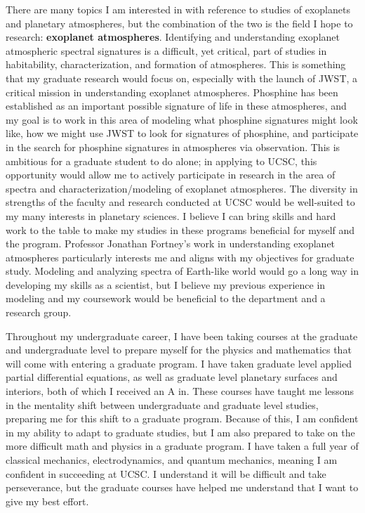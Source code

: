 \documentclass[11pt,letterpaper]{article}
\begin{document}
There are many topics I am interested in with reference to studies of exoplanets and planetary atmospheres, but the combination of the two is the field I hope to research: \textbf{exoplanet atmospheres}. Identifying and understanding exoplanet atmospheric spectral signatures is a difficult, yet critical, part of studies in habitability, characterization, and formation of atmospheres. This is something that my graduate research would focus on, especially with the launch of JWST, a critical mission in understanding exoplanet atmospheres. Phosphine has been established as an important possible signature of life in these atmospheres, and my goal is to work in this area of modeling what phosphine signatures might look like, how we might use JWST to look for signatures of phosphine, and participate in the search for phosphine signatures in atmospheres via observation. This is ambitious for a graduate student to do alone; in applying to UCSC, this opportunity would allow me to actively participate in research in the area of spectra and characterization/modeling of exoplanet atmospheres. The diversity in strengths of the faculty and research conducted at UCSC would be well-suited to my many interests in planetary sciences. I believe I can bring skills and hard work to the table to make my studies in these programs beneficial for myself and the program. Professor Jonathan Fortney's work in understanding exoplanet atmospheres particularly interests me and aligns with my objectives for graduate study. Modeling and analyzing spectra of Earth-like world would go a long way in developing my skills as a scientist, but I believe my previous experience in modeling and my coursework would be beneficial to the department and a research group. 


Throughout my undergraduate career, I have been taking courses at the graduate and undergraduate level to prepare myself for the physics and mathematics that will come with entering a graduate program. I have taken graduate level applied partial differential equations, as well as graduate level planetary surfaces and interiors, both of which I received an A in. These courses have taught me lessons in the mentality shift between undergraduate and graduate level studies, preparing me for this shift to a graduate program. Because of this, I am confident in my ability to adapt to graduate studies, but I am also prepared to take on the more difficult math and physics in a graduate program. I have taken a full year of classical mechanics, electrodynamics, and quantum mechanics, meaning I am confident in succeeding at UCSC. I understand it will be difficult and take perseverance, but the graduate courses have helped me understand that I want to give my best effort.
\end{document}
